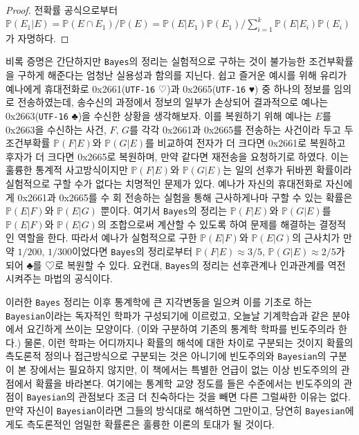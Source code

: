 \begin{proof}
    전확률 공식으로부터 $\mathbb{P}(E_1\vert E)=\mathbb{P}(E\cap E_1)/\mathbb{P}(E)=\mathbb{P}(E\vert E_1)\mathbb{P}(E_1)/\sum_{i=1}^k\mathbb{P}(E\vert E_i)\mathbb{P}(E_i)$가 자명하다.
\end{proof}

비록 증명은 간단하지만 \texttt{Bayes}의 정리는 실험적으로 구하는 것이 불가능한 조건부확률을 구하게 해준다는 엄청난 실용성과 함의를 지닌다. 쉽고 즐거운 예시를 위해 유리가 예나에게 휴대전화로 0x2661(\texttt{UTF-16} ♡)과 0x2665(\texttt{UTF-16} ♥) 중 하나의 정보를 임의로 전송하였는데, 송수신의 과정에서 정보의 일부가 손상되어 결과적으로 예나는 0x2663(\texttt{UTF-16} ♣)을 수신한 상황을 생각해보자. 이를 복원하기 위해 예나는 $E$를 0x2663을 수신하는 사건, $F,\,G$를 각각 0x2661과 0x2665를 전송하는 사건이라 두고 두 조건부확률 $\mathbb{P}(F\vert E)$와 $\mathbb{P}(G\vert E)$를 비교하여 전자가 더 크다면 0x2661로 복원하고 후자가 더 크다면 0x2665로 복원하며, 만약 같다면 재전송을 요청하기로 하였다. 이는 훌륭한 통계적 사고방식이지만 $\mathbb{P}(F\vert E)$와 $\mathbb{P}(G\vert E)$는 일의 선후가 뒤바뀐 확률이라 실험적으로 구할 수가 없다는 치명적인 문제가 있다. 예나가 자신의 휴대전화로 자신에게 0x2661과 0x2665를 수 회 전송하는 실험을 통해 근사하게나마 구할 수 있는 확률은 $\mathbb{P}(E\vert F)$와 $\mathbb{P}(E\vert G)$ 뿐이다. 여기서 \texttt{Bayes}의 정리는 $\mathbb{P}(F\vert E)$와 $\mathbb{P}(G\vert E)$를 $\mathbb{P}(E\vert F)$와 $\mathbb{P}(E\vert G)$의 조합으로써 계산할 수 있도록 하여 문제를 해결하는 결정적인 역할을 한다. 따라서 예나가 실험적으로 구한 $\mathbb{P}(E\vert F)$와 $\mathbb{P}(E\vert G)$의 근사치가 만약 $1/200,\,1/300$이었다면 \texttt{Bayes}의 정리로부터 $\mathbb{P}(F\vert E)\approx3/5,\,\mathbb{P}(G\vert E)\approx2/5$가 되어 ♣를 ♡로 복원할 수 있다. 요컨대, \texttt{Bayes}의 정리는 선후관계나 인과관계를 역전시켜주는 마법의 공식이다.

이러한 \texttt{Bayes} 정리는 이후 통계학에 큰 지각변동을 일으켜 이를 기초로 하는 \texttt{Bayesian}이라는 독자적인 학파가 구성되기에 이르렀고, 오늘날 기계학습과 같은 분야에서 요긴하게 쓰이는 모양이다. (이와 구분하여 기존의 통계학 학파를 빈도주의라 한다.) 물론, 이런 학파는 어디까지나 확률의 해석에 대한 차이로 구분되는 것이지 확률의 측도론적 정의나 접근방식으로 구분되는 것은 아니기에 빈도주의와 \texttt{Bayesian}의 구분이 본 장에서는 필요하지 않지만, 이 책에서는 특별한 언급이 없는 이상 빈도주의의 관점에서 확률을 바라본다. 여기에는 통계학 교양 정도를 들은 수준에서는 빈도주의의 관점이 \texttt{Bayesian}의 관점보다 조금 더 친숙하다는 것을 빼면 다른 그럴싸한 이유는 없다. 만약 자신이 \texttt{Bayesian}이라면 그들의 방식대로 해석하면 그만이고, 당연히 \texttt{Bayesian}에게도 측도론적인 엄밀한 확률론은 훌륭한 이론의 토대가 될 것이다.

